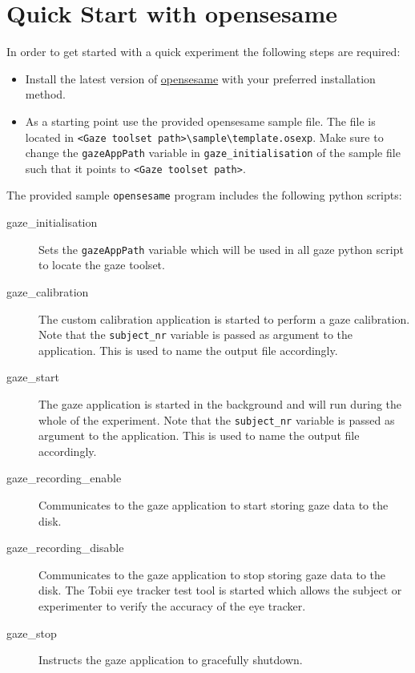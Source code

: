 \documentclass[a4paper,oneside]{book}
\begin{document}
\section{Quick Start with opensesame}
\label{sec.quick.opensesame}
In order to get started with a quick experiment the following steps are required:
\begin{itemize}
    \item Install the latest version of \href{https://osdoc.cogsci.nl/3.3/download/}{opensesame} with your preferred installation method.
    \item As a starting point use the provided opensesame sample file.
        The file is located in \texttt{<Gaze toolset path>\textbackslash sample\textbackslash template.osexp}.
        Make sure to change the \texttt{gazeAppPath} variable in \texttt{gaze\_initialisation} of the sample file such that it points to \texttt{<Gaze toolset path>}.
\end{itemize}

The provided sample \texttt{opensesame} program includes the following python scripts:
\begin{description}
    \item[gaze\_initialisation]
        Sets the \texttt{gazeAppPath} variable which will be used in all gaze python script to locate the gaze toolset.
    \item[gaze\_calibration]
        The custom calibration application is started to perform a gaze calibration.
        Note that the \texttt{subject\_nr} variable is passed as argument to the application.
        This is used to name the output file accordingly.
    \item[gaze\_start]
        The gaze application is started in the background and will run during the whole of the experiment.
        Note that the \texttt{subject\_nr} variable is passed as argument to the application.
        This is used to name the output file accordingly.
    \item[gaze\_recording\_enable]
        Communicates to the gaze application to start storing gaze data to the disk.
    \item[gaze\_recording\_disable]
        Communicates to the gaze application to stop storing gaze data to the disk.
        The Tobii eye tracker test tool is started which allows the subject or experimenter to verify the accuracy of the eye tracker.
    \item[gaze\_stop]
        Instructs the gaze application to gracefully shutdown.
\end{description}
\end{document}
